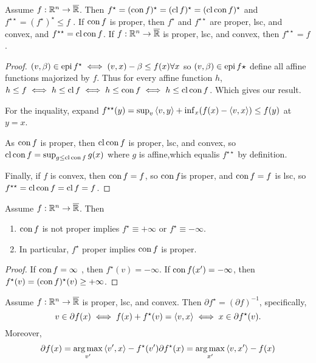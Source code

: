 \begin{thm}
  \label{sec:conjugate-functions-7}
  Assume $f: \mathbb{R}^{n} \rightarrow \overline {\mathbb{R}}$.  Then $f^{\star} =
  (\operatorname*{con} f)^{\star} = (\operatorname*{cl} f)^{\star} = (\operatorname*{cl} \operatorname*{con} f)^{\star}$ and
  $f^{\star \star} = (f^{\star})^{\star} \leq f$ .  If $\operatorname*{con} f$ is
  proper, then $f^{\star}$ and $f^{\star \star}$ are proper, lsc, and
  convex, and $f^{\star \star} = \operatorname*{cl} \operatorname*{con} f$.  If $f: \mathbb{R}^{n}
  \rightarrow \overline {\mathbb{R}}$ is proper, lsc, and convex, then $f^{\star
  \star} = f$.
\end{thm}

\begin{proof}
  $(v, \beta) \in \operatorname*{epi} f^{\star} \iff (v, x) - \beta \leq f(x) \forall
  x$ so $(v, \beta) \in \operatorname*{epi} f\star$ define all affine functions
  majorized by $f$.  Thus for every affine function $h$, $h \leq f
  \iff h \leq \operatorname*{cl} f \iff h \leq \operatorname*{con} f \iff h \leq \operatorname*{cl} \operatorname*{con} f$.  Which
  gives our result.

  For the inquality, expand $f^{\star \star}(y) = \sup_{v} \IP{v, y} +
  \inf_{x}( f(x) - \IP{v, x}) \leq f(y)$ at $y = x$.

  As $\operatorname*{con} f$ is proper, then $\operatorname*{cl} \operatorname*{con} f$ is proper, lsc, and
  convex, so $\operatorname*{cl} \operatorname*{con} f = \sup_{g \leq \operatorname*{cl} \operatorname*{con} f} g(x)$ where $g$ is
  affine,which equalis $f^{\star \star}$ by definition.

  Finally, if $f$ is convex, then $\operatorname*{con} f = f$, so $\operatorname*{con} f$is proper,
  and $\operatorname*{con} f = f$ is lsc, so $f^{\star \star} = \operatorname*{cl} \operatorname*{con} f = \operatorname*{cl} f = f$.
\end{proof}

\begin{thm}
  \label{sec:conjugate-functions-8}
  Assume $f: \mathbb{R}^{n} \rightarrow \overline {\mathbb{R}}$.  Then
  \begin{enumerate}
  \item $\operatorname*{con} f$ is not proper implies $f^{\star} \equiv +\infty$ or
    $f^{\star} \equiv -\infty$.
  \item In particular, $f^{\star}$ proper implies $\operatorname*{con} f$ is proper.
  \end{enumerate}
\end{thm}

\begin{proof}
  If $\operatorname*{con} f = \infty$ , then $f^{\star} (v) = -\infty$.  If $\operatorname*{con}
  f(x') = -\infty$, then $f^{\star}(v) = (\operatorname*{con} f)^{\star}(v) \geq +\infty$.
\end{proof}

\begin{thm}
  \label{sec:conjugate-functions-9}
  Assume $f: \mathbb{R}^{n} \rightarrow \overline {\mathbb{R}}$ is proper, lsc, and
  convex.  Then $\partial f^{\star} = (\partial f)^{-1}$,
  specifically,
  \begin{equation}
    \label{eq:20}
    v \in \partial f(x) \iff f(x) + f^{\star}(v) = \IP{v, x} \iff x
    \in \partial f^{\star}(v).
  \end{equation}
  Moreover,
  \begin{align}
    \label{eq:22}
    \partial f(x) = \argmax_{v'} \IP{v', x} - f^{\star}(v')
    \partial f^{\star}(x) = \argmax_{x'} \IP{v, x'} - f(x)
  \end{align}
\end{thm}

